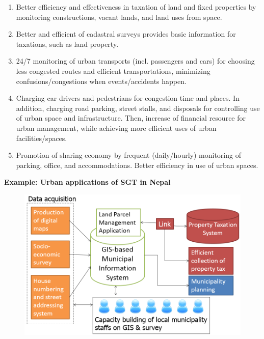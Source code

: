\begin{enumerate}

\item Better efficiency and effectiveness in taxation of land and fixed properties by monitoring constructions, vacant lands, and land uses from space.

\item Better and efficient of cadastral surveys provides basic information for taxations, such as land property.

\item 24/7 monitoring of urban transports (incl. passengers and cars) for choosing less congested routes and efficient transportations, minimizing confusions/congestions when events/accidents happen.

\item Charging car drivers and pedestrians for congestion time and places. In addition, charging road parking, street stalls, and disposals for controlling use of urban space and infrastructure. Then, increase of financial resource for urban management, while achieving more efficient uses of urban facilities/spaces.

\item Promotion of sharing economy by frequent (daily/hourly) monitoring of parking, office, and accommodations. Better efficiency in use of urban spaces.

\end{enumerate}

{\flushleft \bfseries Example: Urban applications of SGT in Nepal}

\begin{figure}[H]
\begin{center}
\includegraphics[width = 0.8\linewidth]{Figures/urban_nepal.png}
\end{center}
\label{urban_nepal}
\end{figure}


